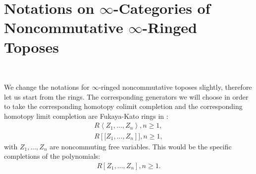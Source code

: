 \documentclass[11pt]{book}
\theoremstyle{definition}
\numberwithin{equation}{section}
\begin{document}
\newpage
\section{Notations on $\infty$-Categories of Noncommutative $\infty$-Ringed Toposes}

\

\indent We change the notations for $\infty$-ringed noncommutative toposes slightly, therefore let us start from the rings. The corresponding generators we will choose in order to take the corresponding homotopy colimit completion and the corresponding homotopy limit completion are Fukaya-Kato rings in \cite{12FK}:
\begin{align}
R\left<Z_1,...,Z_n\right>,n\geq 1,\\
R\left[[Z_1,...,Z_n\right]],n\geq 1,	
\end{align}
with $Z_1,...,Z_n$ are noncommuting free variables. This would be the specific completions of the polynomials:
\begin{align}
R\left[Z_1,...,Z_n\right],n\geq 1.\\	
\end{align}
\end{document}
